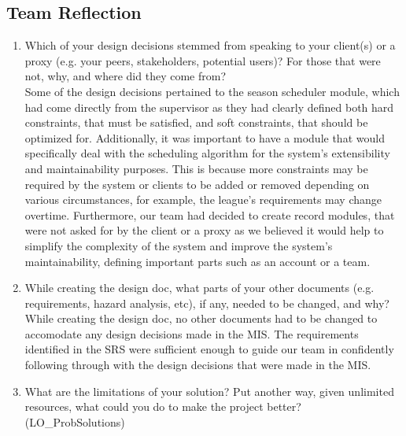 \documentclass[12pt, titlepage]{article}
\begin{document}
\subsection*{Team Reflection}

  \begin{enumerate}
    \item Which of your design decisions stemmed from speaking to your client(s)
    or a proxy (e.g. your peers, stakeholders, potential users)? For those that
    were not, why, and where did they come from?\\

    Some of the design decisions pertained to the season scheduler module, which had come directly from
    the supervisor as they had clearly defined both hard constraints, that must be satisfied, and
    soft constraints, that should be optimized for. Additionally, it was important to have a
    module that would specifically deal with the scheduling algorithm for the system's extensibility and
    maintainability purposes. This is because more constraints may be required by the system
    or clients to be added or removed depending on various circumstances, for example, the league's
    requirements may change overtime. Furthermore, our team had decided to create record modules,
    that were not asked for by the client or a proxy as we believed it would help to simplify the
    complexity of the system and improve the system's maintainability, defining important parts
    such as an account or a team.\\
    
    \item While creating the design doc, what parts of your other documents (e.g.
    requirements, hazard analysis, etc), if any, needed to be changed, and why?\\
    
    While creating the design doc, no other documents had to be changed to accomodate any
    design decisions made in the MIS. The requirements identified in the SRS were sufficient
    enough to guide our team in confidently following through with the design decisions that
    were made in the MIS.\\
    
    \item What are the limitations of your solution? Put another way, given
    unlimited resources, what could you do to make the project better? (LO\_ProbSolutions)\\
    

\end{enumerate}
\end{document}

